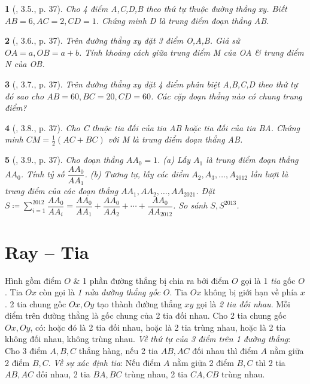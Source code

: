 \documentclass{article}
\newtheorem{baitoan}{}
\begin{document}
\begin{baitoan}[\cite{TLCT_THCS_Toan_6_hinh_hoc}, 3.5., p. 37]
	Cho 4 điểm A,C,D,B theo thứ tự thuộc đường thẳng xy. Biết $AB = 6,AC = 2,CD = 1$. Chứng minh D là trung điểm đoạn thẳng AB.
\end{baitoan}

\begin{baitoan}[\cite{TLCT_THCS_Toan_6_hinh_hoc}, 3.6., p. 37]
	Trên đường thẳng xy đặt 3 điểm O,A,B. Giả sử $OA = a,OB = a + b$. Tính khoảng cách giữa trung điểm M của OA \& trung điểm N của OB.
\end{baitoan}

\begin{baitoan}[\cite{TLCT_THCS_Toan_6_hinh_hoc}, 3.7., p. 37]
	Trên đường thẳng xy đặt 4 điểm phân biệt A,B,C,D theo thứ tự đó sao cho $AB = 60,BC = 20,CD = 60$. Các cặp đoạn thẳng nào có chung trung điểm?
\end{baitoan}

\begin{baitoan}[\cite{TLCT_THCS_Toan_6_hinh_hoc}, 3.8., p. 37]
	Cho C thuộc tia đối của tia AB hoặc tia đối của tia BA. Chứng minh $CM = \frac{1}{2}(AC + BC)$ với M là trung điểm đoạn thẳng AB.
\end{baitoan}

\begin{baitoan}[\cite{TLCT_THCS_Toan_6_hinh_hoc}, 3.9., p. 37]
	Cho đoạn thẳng $AA_0 = 1$. (a) Lấy $A_1$ là trung điểm đoạn thẳng $AA_0$. Tính tỷ số $\dfrac{AA_0}{AA_1}$. (b) Tương tự, lấy các điểm $A_2,A_3,\ldots,A_{2012}$ lần lượt là trung điểm của các đoạn thẳng $AA_1,AA_2,\ldots,AA_{2021}$. Đặt $S\coloneqq\sum_{i=1}^{2012} \dfrac{AA_0}{AA_i} = \dfrac{AA_0}{AA_1} + \dfrac{AA_0}{AA_2} + \cdots + \dfrac{AA_0}{AA_{2012}}$. So sánh $S,S^{2013}$.
\end{baitoan}


\section{Ray -- Tia}
 Hình gồm điểm $O$ \& 1 phần đường thẳng bị chia ra bởi điểm $O$ gọi là 1 \textit{tia} gốc $O$. Tia $Ox$ còn gọi là \textit{1 nửa đường thẳng gốc $O$}. Tia $Ox$ không bị giới hạn về phía $x$.  2 tia chung gốc $Ox,Oy$ tạo thành đường thẳng $xy$ gọi là \textit{2 tia đối nhau}. Mỗi điểm trên đường thẳng là gốc chung của 2 tia đối nhau.  Cho 2 tia chung gốc $Ox,Oy$, có: hoặc đó là 2 tia đối nhau, hoặc là 2 tia trùng nhau, hoặc là 2 tia không đối nhau, không trùng nhau.  \textit{Về thứ tự của 3 điểm trên 1 đường thẳng}: Cho 3 điểm $A,B,C$ thẳng hàng, nếu 2 tia $AB,AC$ đối nhau thì điểm $A$ nằm giữa 2 điểm $B,C$.  \textit{Về sự xác định tia}: Nếu điểm $A$ nằm giữa 2 điểm $B,C$ thì 2 tia $AB,AC$ đối nhau, 2 tia $BA,BC$ trùng nhau, 2 tia $CA,CB$ trùng nhau.
\end{document}

